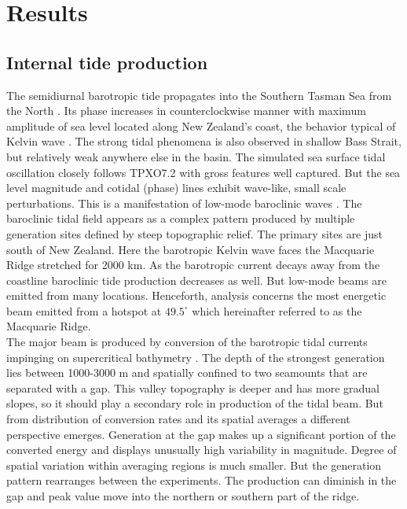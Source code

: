 \documentclass[12pt]{article}
\begin{document}
\section{Results}
\subsection{Internal tide production}
The semidiurnal barotropic tide propagates into the Southern Tasman Sea from the North 
. Its phase increases in counterclockwise manner with maximum amplitude of sea 
level located along New Zealand's coast, the behavior typical of Kelvin wave 
\citep{walters2001ocean}. 
The strong tidal phenomena is also observed in shallow Bass Strait, but relatively weak anywhere 
else in the basin. The simulated sea surface tidal oscillation closely follows TPXO7.2 with gross 
features well captured. But the sea level magnitude and cotidal (phase) lines exhibit wave-like, 
small scale perturbations. This is a manifestation of low-mode baroclinic waves 
. The baroclinic tidal field appears as a complex pattern produced by 
multiple generation sites defined by steep topographic relief. The primary sites are just south of 
New Zealand. Here the barotropic Kelvin wave faces the Macquarie Ridge stretched for 2000 km. As 
the barotropic current decays away from the coastline baroclinic tide production decreases as well. 
But low-mode beams are emitted from many locations. Henceforth, analysis concerns the 
most energetic beam emitted from a hotspot at $49.5^{\circ}$ which hereinafter referred to as the 
Macquarie Ridge.\\

The major beam is produced by conversion of the barotropic tidal currents impinging on 
supercritical bathymetry . The depth of the strongest generation lies between 
1000-3000 m and spatially confined to two seamounts that are separated with a gap. This valley 
topography is deeper and has more gradual slopes, so it should play a secondary role in production 
of the tidal beam. But from distribution of conversion rates  and its 
spatial averages  a different perspective emerges. Generation at the gap 
makes up a significant portion of the converted energy and displays unusually high variability in 
magnitude. Degree of spatial variation within averaging regions is much smaller. But the generation 
pattern rearranges between the experiments. The production can diminish in the gap and peak value 
move into the northern or southern part of the ridge.\\
\end{document}
